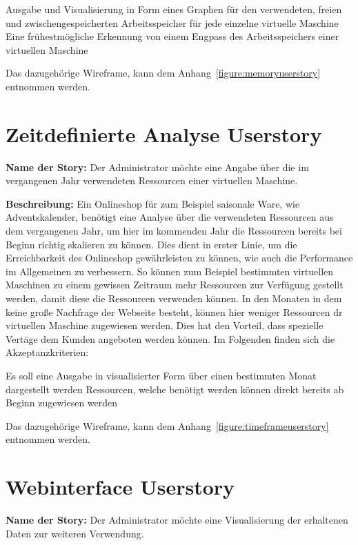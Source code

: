 {\begin{outline}
  \1 Ausgabe und Visualisierung in Form eines Graphen für den verwendeten,
  freien und zwischengespeicherten Arbeitsspeicher für jede einzelne virtuelle
  Maschine
  \1 Eine frühestmögliche Erkennung von einem Engpass des Arbeitsspeichers
  einer virtuellen Maschine
\end{outline}

Das dazugehörige Wireframe, kann dem Anhang~\ref{figure:memoryuserstory}
entnommen werden.
\mr%

\section{Zeitdefinierte Analyse Userstory}
\textbf{Name der Story:} Der Administrator möchte eine Angabe über die im
vergangenen Jahr verwendeten Ressourcen einer virtuellen Maschine.

\textbf{Beschreibung:} Ein Onlineshop für zum Beispiel saisonale Ware, wie
Adventskalender, benötigt eine Analyse über die verwendeten Ressourcen aus dem
vergangenen Jahr, um hier im kommenden Jahr die Ressourcen bereits bei Beginn
richtig skalieren zu können. Dies dient in erster Linie, um die Erreichbarkeit
des Onlineshop gewährleisten zu können, wie auch die Performance im Allgemeinen
zu verbessern. So können zum Beispiel bestimmten virtuellen Maschinen zu einem
gewissen Zeitraum mehr Ressourcen zur Verfügung gestellt werden, damit diese
die Ressourcen verwenden können. In den Monaten in dem keine große Nachfrage
der Webseite besteht, können hier weniger Ressourcen dr virtuellen Maschine
zugewiesen werden. Dies hat den Vorteil, dass spezielle Vertäge dem Kunden
angeboten werden können. Im Folgenden finden sich die Akzeptanzkriterien:

\begin{outline}
  \1 Es soll eine Ausgabe in visualisierter Form über einen bestimmten Monat
  dargestellt werden
  \1 Ressourcen, welche benötigt werden können direkt bereits ab Beginn
  zugewiesen werden
\end{outline}

Das dazugehörige Wireframe, kann dem Anhang~\ref{figure:timeframeuserstory}
entnommen werden.
\mr%

\section{Webinterface Userstory}
\textbf{Name der Story:} Der Administrator möchte eine Visualisierung der
erhaltenen Daten zur weiteren Verwendung.

}
